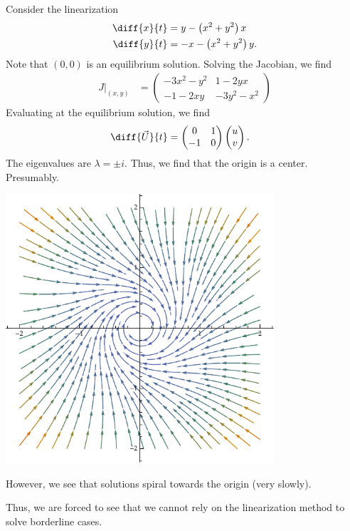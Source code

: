 \documentclass[10pt]{mypackage}
\begin{document}
\begin{example}
  Consider the linearization
  \begin{align*}
    \diff{x}{t} &= y - \left(x^2 + y^2\right)x\\
    \diff{y}{t} &= -x-\left(x^2 + y^2\right)y.
  \end{align*}
  Note that $\left(0,0\right)$ is an equilibrium solution. Solving the Jacobian, we find
  \begin{align*}
    J|_{\left(x,y\right)} &= \begin{pmatrix}-3x^2 - y^2 & 1-2yx\\-1-2xy & -3y^2 - x^2\end{pmatrix}
  \end{align*}
  Evaluating at the equilibrium solution, we find
  \begin{align*}
    \diff{\vec{U}}{t} &=  \begin{pmatrix}0 & 1 \\ -1 & 0\end{pmatrix} \begin{pmatrix}u\\v\end{pmatrix}.
  \end{align*}
  The eigenvalues are $\lambda = \pm i$. Thus, we find that the origin is a center. Presumably.
  \begin{center}
    \includegraphics[width=10cm]{images/linearizing_system_2.pdf}
  \end{center}
  However, we see that solutions spiral towards the origin (very slowly).
\end{example}
Thus, we are forced to see that we cannot rely on the linearization method to solve borderline cases.\newline
\end{document}

